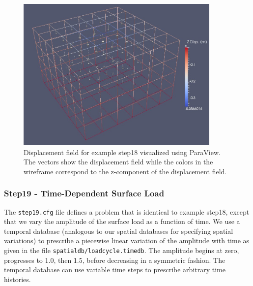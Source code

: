 \begin{figure}
\begin{centering}
\includegraphics[width=10cm]{tutorials/3dhex8/figs/step18-displ}
\par\end{centering}

\caption{Displacement field for example step18 visualized using ParaView. The
vectors show the displacement field while the colors in the wireframe
correspond to the z-component of the displacement field.\label{fig:step18-displ}}
\end{figure}



\subsubsection{Step19 - Time-Dependent Surface Load}

The \texttt{step19.cfg} file defines a problem that is identical to
example step18, except that we vary the amplitude of the surface load
as a function of time. We use a temporal database (analogous to our
spatial databases for specifying spatial variations) to prescribe
a piecewise linear variation of the amplitude with time as given in
the file \texttt{spatialdb/loadcycle.timedb}. The amplitude begins
at zero, progresses to 1.0, then 1.5, before decreasing in a symmetric
fashion. The temporal database can use variable time steps to prescribe
arbitrary time histories. 

